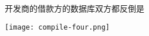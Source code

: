 \documentclass[demo]{report}
\begin{document}
\begin{tcolorbox}[every float=\centering]
    开发商的借款方的数据库双方都反倒是

    \texttt{[image: compile-four.png]}
    \label{fig:fig1}
    
\end{tcolorbox}
\end{document}
